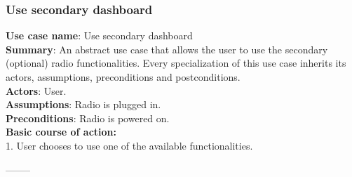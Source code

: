 \documentclass[11pt]{article}
\begin{document}
\subsubsection{Use secondary dashboard}
\textbf{Use case name}: Use secondary dashboard\\
\textbf{Summary}: An abstract use case that allows the user to use the secondary (optional) radio functionalities. Every specialization of this use case inherits its actors, assumptions, preconditions and postconditions.\\
\textbf{Actors}: User.\\
\textbf{Assumptions}: Radio is plugged in.\\
\textbf{Preconditions}: Radio is powered on.\\
\textbf{Basic course of action:}\\
\hspace*{10mm}1. User chooses to use one of the available functionalities.
\begin{center}--------\end{center}
\end{document}
